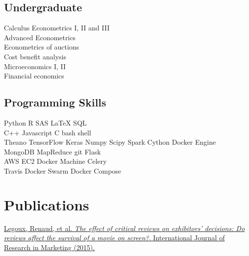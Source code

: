 \documentclass[]{deedy-resume-openfont}
\begin{document}
\begin{minipage}[t]{0.33\textwidth}
\subsection{Undergraduate}
Calculus
Econometrics I, II and III \\
Advanced Econometrics \\
Econometrics of auctions \\
Cost benefit analysis \\
Microeconomics I, II \\
Financial economics \\
\sectionsep


\subsection{Programming Skills}
Python \textbullet{} R \textbullet{} SAS \textbullet{}
\LaTeX \textbullet{} SQL \\
C++ \textbullet{} Javascript \textbullet{} C \textbullet{} bash shell \\
Theano \textbullet{}  TensorFlow \textbullet{}  Keras  \textbullet{}  Numpy
Scipy \textbullet{} Spark \textbullet{} Cython \textbullet{} Docker Engine \\
MongoDB \textbullet{}  MapReduce \textbullet{}  git \textbullet{} Flask  \\
AWS EC2 \textbullet{}  Docker Machine \textbullet{} Celery  \\
Travis \textbullet{} Docker Swarm \textbullet{} Docker Compose \\

\sectionsep

\section{Publications}
\begingroup
\renewcommand{\section}[2]{}%
\begin{thebibliography}{1}
          \href{http://www.sciencedirect.com/science/article/pii/S016781161500083X}{Legoux, Renaud, et al. \emph{The effect of critical reviews on exhibitors' decisions: Do reviews affect the survival of a movie on screen?}. International Journal of Research in Marketing (2015).}
\end{thebibliography}
\endgroup


%
%

\end{minipage} 
\end{document}
